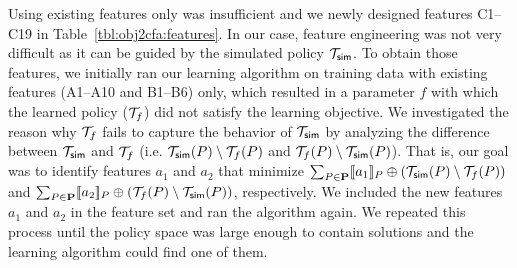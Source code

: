 Using existing features only was
insufficient 
and we newly designed features C1--C19 in
Table~\ref{tbl:obj2cfa:features}.  In our case, feature engineering was not very difficult as it
can be guided by the simulated policy $\mathcal{T}_{{\sf sim}}$.  To obtain those
features, we initially ran our learning algorithm on training data
with existing features (A1--A10 and B1--B6) only, which resulted in a
parameter $f$ with which the learned policy ($\mathcal{T}_{f}$) did not
satisfy the learning objective. We investigated the reason why $\mathcal{T}_{f}$
fails to capture the behavior of $\mathcal{T}_{{\sf sim}}$ by analyzing the
difference between $\mathcal{T}_{{\sf sim}}$ and $\mathcal{T}_f$ 
(i.e. $\mathcal{T}_{{\sf sim}}(P)\setminus \mathcal{T}_{f}(P)$ and
$\mathcal{T}_{f}(P) \setminus \mathcal{T}_{{\sf sim}}(P)$). 
That is, our goal was to identify features $a_1$ and
$a_2$ that minimize
$\sum_{P\in \mathbf{P}} [\![a_1]\!]_P \oplus (\mathcal{T}_{{\sf sim}}(P) \setminus
\mathcal{T}_f(P))$ and
$\sum_{P\in \mathbf{P}} [\![a_2]\!]_P \oplus (\mathcal{T}_f(P) \setminus
\mathcal{T}_{{\sf sim}}(P))$, respectively. 
We included the new 
features $a_1$ and $a_2$ in the feature set and ran the 
algorithm  again. 
We repeated this process until the policy space was large enough to contain solutions and the learning
algorithm could find one of them.








